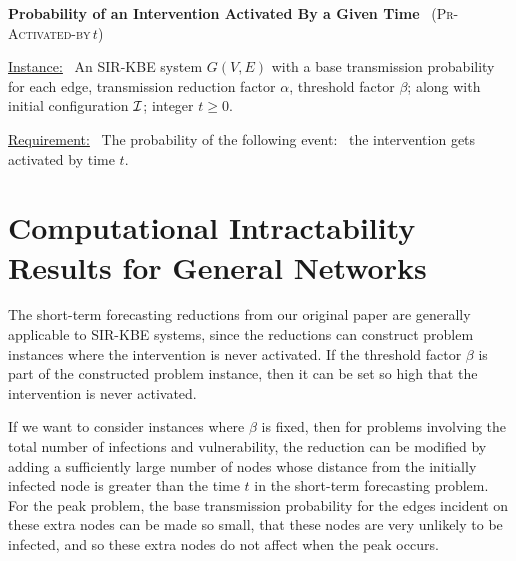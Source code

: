 \documentclass[11pt]{article}
\newcommand{\cali}{\mbox{${\cal I}$}}
\newcommand{\tActivatedBy}{\mbox{\textsc{Pr-Activated-by}$\,t$}}
\begin{document}
\noindent
\textbf{Probability of an Intervention Activated By a Given Time}~ (\tActivatedBy)

\medskip
\noindent
\underline{Instance:}~ An SIR-KBE system $G(V,E)$ with a base transmission probability for each edge,
transmission reduction factor $\alpha$, threshold factor $\beta$;
along with initial configuration \cali; integer $t \geq 0$.

\smallskip
\noindent
\underline{Requirement:}~ The probability of the following
event:~ the intervention gets activated by time $t$.





\bigskip

\section{Computational Intractability Results for General Networks}
\label{sec:general_results}

The short-term forecasting reductions from our original paper 
are generally applicable to SIR-KBE systems,
since the reductions can construct problem instances where the intervention is never activated.
If the threshold factor $\beta$ is part of the constructed problem instance,
then it can be set so high that the intervention is never activated.

If we want to consider instances where $\beta$ is fixed,
then for problems involving the total number of infections and vulnerability,
the reduction can be modified by adding a sufficiently large number of nodes 
whose distance from the initially infected node is greater than the time $t$
in the short-term forecasting problem.
For the peak problem, 
the base transmission probability for the edges incident on these extra nodes can be made so small, 
that these nodes are very unlikely to be infected, 
and so these extra nodes do not affect when the peak occurs. 
\end{document}
